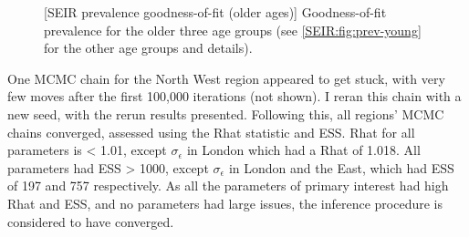 \documentclass[thesis.tex]{subfiles}
\begin{document}
\begin{figure}
    \vspace{-3cm}
    \captionsetup{width=0.8\paperwidth}
    [SEIR prevalence goodness-of-fit (older ages)]{%
        Goodness-of-fit prevalence for the older three age groups (see \cref{SEIR:fig:prev-young} for the other age groups and details).
    }
    \label{SEIR:fig:prev-old}
\end{figure}

One MCMC chain for the North West region appeared to get stuck, with very few moves after the first 100,000 iterations (not shown).
I reran this chain with a new seed, with the rerun results presented.
Following this, all regions' MCMC chains converged, assessed using the Rhat statistic and ESS.
Rhat for all parameters is < 1.01, except $\sigma_\epsilon$ in London which had a Rhat of 1.018.
All parameters had ESS > 1000, except $\sigma_\epsilon$ in London and the East, which had ESS of 197 and 757 respectively.
As all the parameters of primary interest had high Rhat and ESS, and no parameters had large issues, the inference procedure is considered to have converged.
\end{document}
